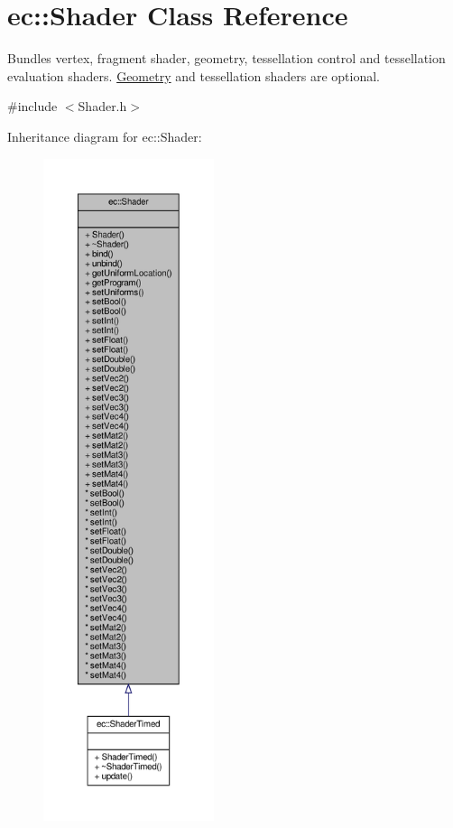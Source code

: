 \hypertarget{classec_1_1_shader}{}\section{ec\+:\+:Shader Class Reference}
\label{classec_1_1_shader}


Bundles vertex, fragment shader, geometry, tessellation control and tessellation evaluation shaders. \mbox{\hyperlink{classec_1_1_geometry}{Geometry}} and tessellation shaders are optional.  




{\ttfamily \#include $<$Shader.\+h$>$}



Inheritance diagram for ec\+:\+:Shader\+:\nopagebreak
\begin{figure}[H]
\begin{center}
\leavevmode
\includegraphics[height=550pt]{classec_1_1_shader__inherit__graph}
\end{center}
\end{figure}


